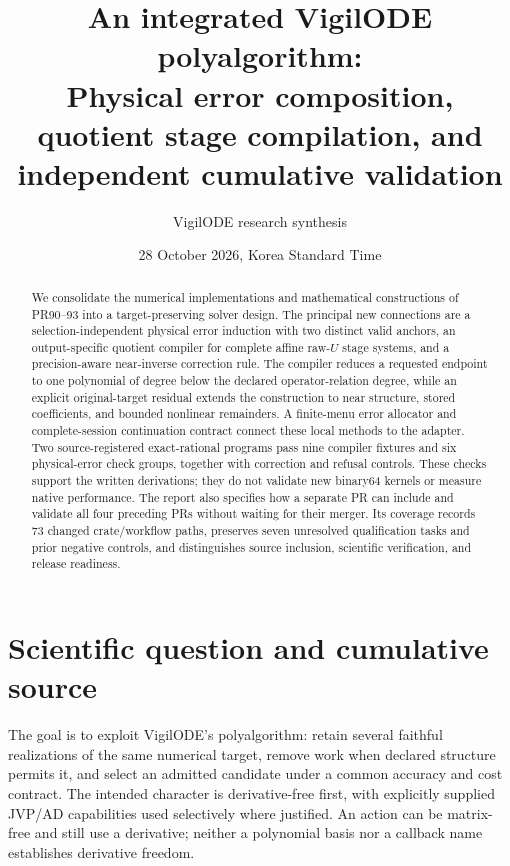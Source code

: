 \documentclass[aps,pra,reprint,onecolumn,10pt,notitlepage,nofootinbib]{revtex4-2}
\begin{document}
\title{An integrated VigilODE polyalgorithm:\texorpdfstring{\\}{ }
Physical error composition, quotient stage compilation, and independent cumulative validation}
\author{VigilODE research synthesis}
\noaffiliation
\date{28 October 2026, Korea Standard Time}
\begin{abstract}
We consolidate the numerical implementations and mathematical constructions of
PR90--93 into a target-preserving solver design. The principal new connections
are a selection-independent physical error induction with two distinct valid
anchors, an output-specific quotient compiler for complete affine raw-$U$ stage
systems, and a precision-aware near-inverse correction rule. The compiler
reduces a requested endpoint to one polynomial of degree below the declared
operator-relation degree, while an explicit original-target residual extends
the construction to near structure, stored coefficients, and bounded nonlinear
remainders. A finite-menu error allocator and complete-session continuation
contract connect these local methods to the adapter. Two source-registered
exact-rational programs pass nine compiler fixtures and six physical-error
check groups, together with correction and refusal controls. These checks
support the written derivations; they do not validate new binary64 kernels or
measure native performance. The report also specifies how a separate PR can
include and validate all four preceding PRs without waiting for their merger.
Its coverage records 73 changed crate/workflow paths, preserves seven unresolved
qualification tasks and prior negative controls, and distinguishes source
inclusion, scientific verification, and release readiness.
\end{abstract}
\maketitle

\section{Scientific question and cumulative source}

The goal is to exploit VigilODE's polyalgorithm: retain several faithful
realizations of the same numerical target, remove work when declared structure
permits it, and select an admitted candidate under a common accuracy and cost
contract. The intended character is derivative-free first, with explicitly
supplied JVP/AD capabilities used selectively where justified. An action can
be matrix-free and still use a derivative; neither a polynomial basis nor a
callback name establishes derivative freedom.
\end{document}
